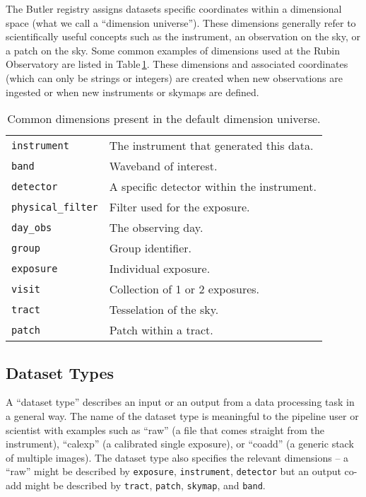 The Butler registry assigns datasets specific coordinates within a dimensional space (what we call a ``dimension universe'').
These dimensions generally refer to scientifically useful concepts such as the instrument, an observation on the sky, or a patch on the sky.
Some common examples of dimensions used at the Rubin Observatory are listed in Table\,\ref{tab:dimensions}.
These dimensions and associated coordinates (which can only be strings or integers) are created when new observations are ingested or when new instruments or skymaps are defined.

\begin{table}
\begin{tabular}{ll}
\texttt{instrument} &  The instrument that generated this data. \\
\texttt{band} & Waveband of interest.  \\
\texttt{detector} & A specific detector within the instrument. \\
\texttt{physical\_filter} &  Filter used for the exposure. \\
\texttt{day\_obs} & The observing day. \\
\texttt{group} &  Group identifier. \\
\texttt{exposure} & Individual exposure. \\
\texttt{visit} &  Collection of 1 or 2 exposures. \\
\texttt{tract} &  Tesselation of the sky. \\
\texttt{patch} &  Patch within a tract.\\
\end{tabular}
\caption{Common dimensions present in the default dimension universe.}
\label{tab:dimensions}
\end{table}

\subsection{Dataset Types}

A ``dataset type'' describes an input or an output from a data processing task in a general way.
The name of the dataset type is meaningful to the pipeline user or scientist with examples such as ``raw'' (a file that comes straight from the instrument), ``calexp'' (a calibrated single exposure), or ``coadd'' (a generic stack of multiple images).
The dataset type also specifies the relevant dimensions -- a ``raw'' might be described by \texttt{exposure}, \texttt{instrument}, \texttt{detector} but an output co-add might be described by \texttt{tract}, \texttt{patch}, \texttt{skymap}, and \texttt{band}.

